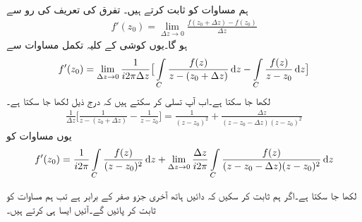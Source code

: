 \quad
ہم مساوات  کو ثابت کرتے ہیں۔ تفرق کی تعریف کی رو سے
\begin{align*}
f'(z_0)=\lim_{\Delta z\to 0} \frac{f(z_0+\Delta z)-f(z_0)}{\Delta z}
\end{align*}
ہو گا۔یوں کوشی کے کلیہ تکمل مساوات  سے
\begin{align}\label{مساوات_مخلوط_تکمل_تحلیلی_تفاعل_تفرق_پ}
f'(z_0)=\lim_{\Delta z \to 0} \frac{1}{i2\pi \Delta z}\big[\int\limits_C\frac{f(z)}{z-(z_0+\Delta z)}\dif z-\int\limits_C\frac{f(z)}{z-z_0}\dif z  \big]   
\end{align}
لکھا جا سکتا ہے۔اب آپ تسلی کر سکتے ہیں کہ درج ذیل لکھا جا سکتا ہے۔
\begin{align*}
\frac{1}{\Delta z}\big[\frac{1}{z-(z_0+\Delta z)}-\frac{1}{z-z_0}\big]=\frac{1}{(z-z_0)^2}+\frac{\Delta z}{(z-z_0-\Delta z)(z-z_0)^2}
\end{align*}
یوں مساوات  کو
\begin{align*}
f'(z_0)=\frac{1}{i2\pi}\int\limits_C \frac{f(z)}{(z-z_0)^2}\dif z+\lim_{\Delta z\to 0}\frac{\Delta z}{i2\pi}\int\limits_C\frac{f(z)}{(z-z_0-\Delta z)(z-z_0)^2}\dif z
\end{align*}

لکھا جا سکتا ہے۔اگر ہم ثابت کر سکیں کہ دائیں ہاتھ آخری جزو صفر کے برابر ہے تب ہم مساوات  کو ثابت کر پائیں گے۔آئیں ایسا ہی کرتے ہیں۔

